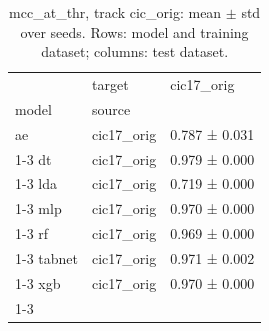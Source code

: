 \begin{table}
\caption{mcc_at_thr, track cic_orig: mean $\pm$ std over seeds. Rows: model and training dataset; columns: test dataset.}
\label{tab:matrix_cic_orig_mcc_at_thr}
\begin{tabular}{lll}
\toprule
 & target & cic17_orig \\
model & source &  \\
\midrule
ae & cic17_orig & 0.787 ± 0.031 \\
\cline{1-3}
dt & cic17_orig & 0.979 ± 0.000 \\
\cline{1-3}
lda & cic17_orig & 0.719 ± 0.000 \\
\cline{1-3}
mlp & cic17_orig & 0.970 ± 0.000 \\
\cline{1-3}
rf & cic17_orig & 0.969 ± 0.000 \\
\cline{1-3}
tabnet & cic17_orig & 0.971 ± 0.002 \\
\cline{1-3}
xgb & cic17_orig & 0.970 ± 0.000 \\
\cline{1-3}
\bottomrule
\end{tabular}
\end{table}
